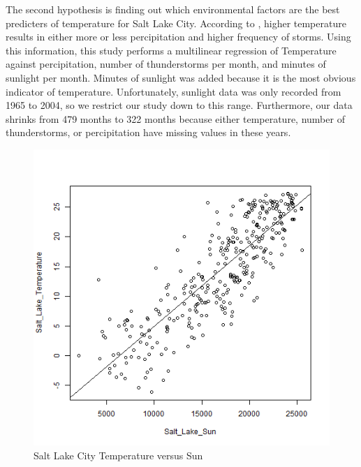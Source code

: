 The second hypothesis is finding out which environmental factors are the best predicters of temperature for Salt Lake City. According to \cite{epa_utah}, higher temperature results in either more or less percipitation and higher frequency of storms. Using this information, this study performs a multilinear regression of Temperature against percipitation, number of thunderstorms per month, and minutes of sunlight per month. Minutes of sunlight was added because it is the most obvious indicator of temperature. Unfortunately, sunlight data was only recorded from 1965 to 2004, so we restrict our study down to this range. Furthermore, our data shrinks from 479 months to 322 months because either temperature, number of thunderstorms, or percipitation have missing values in these years.

\begin{figure}
  \centering
  \includegraphics[width=15cm]{../data/img/Temp_vs_sun.PNG}
  \caption{Salt Lake City Temperature versus Sun}
  \label{fig:temp_vs_sun}
\end{figure}

